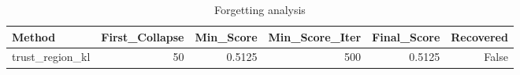 \begin{table}[htbp]
\centering
\caption{Forgetting analysis}
\label{tab:forgetting}
\begin{tabular}{lrrrrr}
\toprule
\textbf{Method} & \textbf{First\_Collapse} & \textbf{Min\_Score} & \textbf{Min\_Score\_Iter} & \textbf{Final\_Score} & \textbf{Recovered} \\
\midrule
trust\_region\_kl & 50 & 0.5125 & 500 & 0.5125 & False \\
\bottomrule
\end{tabular}
\end{table}